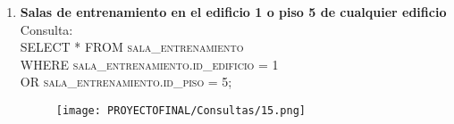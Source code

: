 \documentclass[12pt,letterpaper]{article}
\begin{document}
\begin{enumerate}
    \item \textbf{Salas de entrenamiento en el edificio 1 o piso 5 de cualquier edificio}\\
     Consulta:\\ \textsc{ SELECT * FROM sala\_entrenamiento\\ WHERE sala\_entrenamiento.id\_edificio = 1\\ OR sala\_entrenamiento.id\_piso = 5;
}%
\begin{figure}[h]
    \centering
    \texttt{[image: PROYECTOFINAL/Consultas/15.png]}
\end{figure}
     
    
\end{enumerate}
\end{document}
